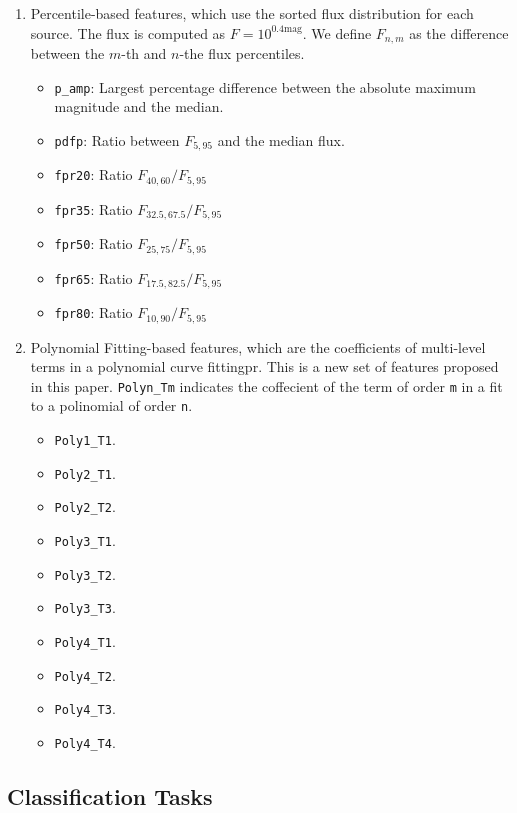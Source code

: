 \documentclass[a4paper,fleqn,usenatbib]{mnras}
\begin{document}
\begin{enumerate}
  \item Percentile-based features, which use the sorted flux distribution for
    each source. The flux is computed as $F = 10^{0.4 \mathrm{mag}}$. 
    We define $F_{n,m}$ as the difference between the $m$-th and $n$-the flux
    percentiles. 
    \begin{itemize}
    \item \texttt{p\_amp}: 
      Largest percentage difference between the absolute maximum
      magnitude and the median. 
    \item \texttt{pdfp}: 
      Ratio between $F_{5,95}$ and the median flux.
    \item \texttt{fpr20}: 
      Ratio $F_{40,60} / F_{5,95}$
    \item \texttt{fpr35}:
      Ratio $F_{32.5,67.5} / F_{5,95}$
    \item \texttt{fpr50}: 
      Ratio $F_{25,75} / F_{5,95}$
    \item \texttt{fpr65}: 
      Ratio $F_{17.5,82.5} / F_{5,95}$
    \item \texttt{fpr80}: 
      Ratio $F_{10,90} / F_{5,95}$
    \end{itemize}
    
  \item Polynomial Fitting-based features, which are the coefficients of
    multi-level terms in a polynomial curve fittingpr. This is a new set
    of features proposed in this paper. 
    \texttt{Polyn\_Tm} indicates the coffecient of the term of order
    \texttt{m} in a fit to a polinomial of order \texttt{n}.
    \begin{itemize}
        \item \texttt{Poly1\_T1}.
        \item \texttt{Poly2\_T1}.
        \item \texttt{Poly2\_T2}.
        \item \texttt{Poly3\_T1}.
        \item \texttt{Poly3\_T2}.
        \item \texttt{Poly3\_T3}.
        \item \texttt{Poly4\_T1}.
        \item \texttt{Poly4\_T2}.
        \item \texttt{Poly4\_T3}.
        \item \texttt{Poly4\_T4}.
    \end{itemize}    
\end{enumerate}

\subsection{Classification Tasks} \label{subsection_classification}
\end{document}
